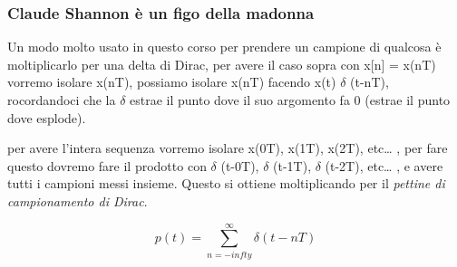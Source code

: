 \documentclass[11pt]{article}
\begin{document}
\subsubsection{Claude Shannon è un figo della madonna}
\label{sec:org834d089}

Un modo molto usato in questo corso per prendere un campione di
qualcosa è moltiplicarlo per una delta di Dirac, per avere 
il caso sopra con x[n] = x(nT) vorremo isolare x(nT), possiamo isolare
x(nT) facendo x(t)\texttimes{} \(\delta\) (t-nT), rocordandoci che la \(\delta\)
estrae il punto dove il suo argomento fa 0 (estrae il punto dove
esplode).\par 

per avere l'intera sequenza vorremo isolare x(0T), x(1T), x(2T),
etc\ldots{} , per fare questo dovremo fare il prodotto con \(\delta\) (t-0T),
\(\delta\) (t-1T), \(\delta\) (t-2T), etc\ldots{} , e avere tutti i campioni messi
insieme. Questo si ottiene moltiplicando per il \emph{pettine di
campionamento di Dirac}.

\[
p(t) = \sum_{n=-infty}^{\infty} \delta (t-nT)
\]
\end{document}
